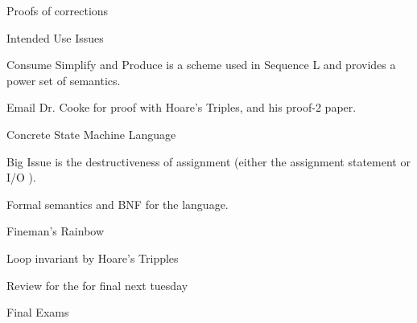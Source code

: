 Proofs of corrections

Intended Use Issues

Consume Simplify and Produce is a scheme used in Sequence L and provides a power set of semantics.   

Email Dr. Cooke for proof with Hoare's Triples, and his proof-2 paper.  

Concrete State Machine Language


Big Issue is the destructiveness of assignment (either the assignment statement or I/O ).  


Formal semantics and BNF for the language.  

Fineman's Rainbow


Loop invariant by Hoare's Tripples 


Review for the for final next tuesday

Final Exams
